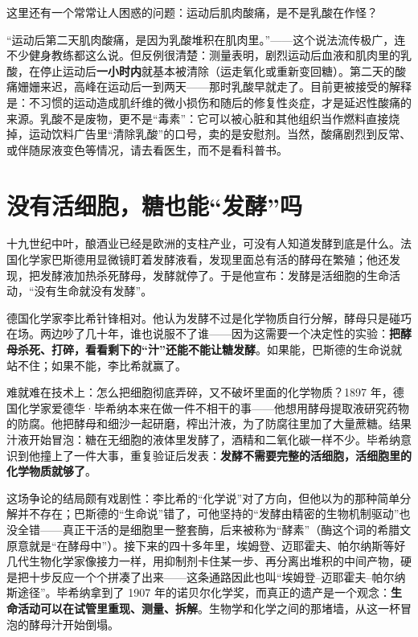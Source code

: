 这里还有一个常常让人困惑的问题：运动后肌肉酸痛，是不是乳酸在作怪？

\begin{wuqu}
“运动后第二天肌肉酸痛，是因为乳酸堆积在肌肉里。”——这个说法流传极广，连不少健身教练都这么说。但反例很清楚：测量表明，剧烈运动后血液和肌肉里的乳酸，在停止运动后\textbf{一小时内}就基本被清除（运走氧化或重新变回糖）。第二天的酸痛姗姗来迟，高峰在运动后一到两天——那时乳酸早就走了。目前更被接受的解释是：不习惯的运动造成肌纤维的微小损伤和随后的修复性炎症，才是延迟性酸痛的来源。乳酸不是废物，更不是“毒素”：它可以被心脏和其他组织当作燃料直接烧掉，运动饮料广告里“清除乳酸”的口号，卖的是安慰剂。当然，酸痛剧烈到反常、或伴随尿液变色等情况，请去看医生，而不是看科普书。
\end{wuqu}

\section{没有活细胞，糖也能“发酵”吗}

\begin{zhengju}
十九世纪中叶，酿酒业已经是欧洲的支柱产业，可没有人知道发酵到底是什么。法国化学家巴斯德用显微镜盯着发酵液看，发现里面总有活的酵母在繁殖；他还发现，把发酵液加热杀死酵母，发酵就停了。于是他宣布：发酵是活细胞的生命活动，“没有生命就没有发酵”。

德国化学家李比希针锋相对。他认为发酵不过是化学物质自行分解，酵母只是碰巧在场。两边吵了几十年，谁也说服不了谁——因为这需要一个决定性的实验：\textbf{把酵母杀死、打碎，看看剩下的“汁”还能不能让糖发酵}。如果能，巴斯德的生命说就站不住；如果不能，李比希就赢了。

难就难在技术上：怎么把细胞彻底弄碎，又不破坏里面的化学物质？1897 年，德国化学家爱德华·毕希纳本来在做一件不相干的事——他想用酵母提取液研究药物的防腐。他把酵母和细沙一起研磨，榨出汁液，为了防腐往里加了大量蔗糖。结果汁液开始冒泡：糖在无细胞的液体里发酵了，酒精和二氧化碳一样不少。毕希纳意识到他撞上了一件大事，重复验证后发表：\textbf{发酵不需要完整的活细胞，活细胞里的化学物质就够了}。

这场争论的结局颇有戏剧性：李比希的“化学说”对了方向，但他以为的那种简单分解并不存在；巴斯德的“生命说”错了，可他坚持的“发酵由精密的生物机制驱动”也没全错——真正干活的是细胞里一整套酶，后来被称为“酵素”（酶这个词的希腊文原意就是“在酵母中”）。接下来的四十多年里，埃姆登、迈耶霍夫、帕尔纳斯等好几代生物化学家像接力一样，用抑制剂卡住某一步、再分离出堆积的中间产物，硬是把十步反应一个个拼凑了出来——这条通路因此也叫“埃姆登–迈耶霍夫–帕尔纳斯途径”。毕希纳拿到了 1907 年的诺贝尔化学奖，而真正的遗产是一个观念：\textbf{生命活动可以在试管里重现、测量、拆解}。生物学和化学之间的那堵墙，从这一杯冒泡的酵母汁开始倒塌。
\end{zhengju}


